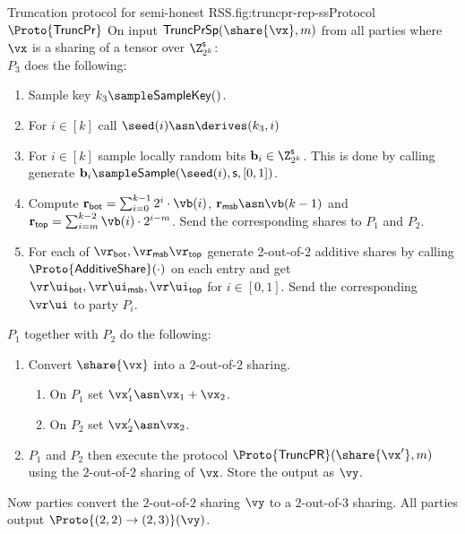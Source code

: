 \begin{Boxfig}{Truncation protocol for semi-honest
RSS.}{fig:truncpr-rep-ss}{Protocol $\Proto{\mathsf{TruncPr}}$}
On input
$\mathsf{TruncPrSp}(\share{\vx}, m)$ from all parties where $\vx$ is a sharing
of a tensor over $\Z_{2^k}^{\mathsf{s}}$: \\
$P_3$ does the following:
  \begin{enumerate}
    \item Sample key $k_3 \sample \mathsf{SampleKey}()$.
    \item For $i \in [k]$ call $\seed(i) \asn \derives(k_3, i)$
    \item For $i \in [k]$ sample locally random bits $\mathbf{b}_i \in \Z_{2^k}^{\mathsf{s}}$.
    This is done by calling
    generate $\mathbf{b}_i \sample \mathsf{Sample}(\seed(i), \mathsf{s}, [0,1])$.
    \item Compute
    $\mathbf{r}_{\mathsf{bot}} = \sum_{i=0}^{k-1}2^i \cdot \vb(i)$,
    $\mathbf{r}_{\mathsf{msb}} \asn \vb(k-1)$ and
    $\mathbf{r}_{\mathsf{top}} = \sum_{i=m}^{k-2} \vb(i) \cdot 2^{i-m}$. Send
    the corresponding shares to $P_1$ and $P_2$.
    \item For each of $\vr_{\mathsf{bot}}, \vr_{\mathsf{msb}} \vr_{\mathsf{top}}$
    generate 2-out-of-2 additive shares by calling $\Proto{\mathsf{AdditiveShare}}(\cdot)$
    on each entry and get $
    \vr\ui_{\mathsf{bot}}, \vr\ui_{\mathsf{msb}}, \vr\ui_{\mathsf{top}}$ for $i \in [0,1]$. Send the corresponding $\vr\ui$ to party $P_i$.
 \end{enumerate}
$P_1$ together with $P_2$ do the following:

\begin{enumerate}
   \item Convert $\share{\vx}$ into a $2$-out-of-$2$ sharing.
   \begin{enumerate}
      \item On $P_1$ set $\vx'_1 \asn \vx_1 + \vx_2$.
      \item On $P_2$ set $\vx'_2 \asn \vx_2$.
   \end{enumerate}

   \item $P_1$ and $P_2$ then execute the protocol $\Proto{\mathsf{TruncPR}}(\share{\vx'}, m)$
   using the $2$-out-of-$2$ sharing of $\vx$. Store the output as $\vy$.
\end{enumerate}

 Now parties convert the $2$-out-of-$2$ sharing $\vy$ to a $2$-out-of-$3$
 sharing. All parties output $\Proto{(2,2)\rightarrow(2,3)}(\vy)$.


\end{Boxfig}

